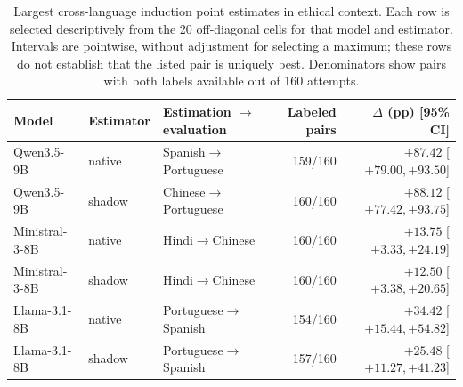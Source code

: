 \begin{table}[t]
\centering\footnotesize\setlength{\tabcolsep}{4pt}
\begin{tabular}{lllrr}
\toprule
Model & Estimator & Estimation $\to$ evaluation & Labeled pairs & $\Delta$ (pp) [95\% CI] \\
\midrule
Qwen3.5-9B & native & Spanish$\to$Portuguese & 159/160 & $+87.42$ [$ +79.00, +93.50 $] \\
Qwen3.5-9B & shadow & Chinese$\to$Portuguese & 160/160 & $+88.12$ [$ +77.42, +93.75 $] \\
Ministral-3-8B & native & Hindi$\to$Chinese & 160/160 & $+13.75$ [$ +3.33, +24.19 $] \\
Ministral-3-8B & shadow & Hindi$\to$Chinese & 160/160 & $+12.50$ [$ +3.38, +20.65 $] \\
Llama-3.1-8B & native & Portuguese$\to$Spanish & 154/160 & $+34.42$ [$ +15.44, +54.82 $] \\
Llama-3.1-8B & shadow & Portuguese$\to$Spanish & 157/160 & $+25.48$ [$ +11.27, +41.23 $] \\
\bottomrule
\end{tabular}
\caption{Largest cross-language induction point estimates in ethical context. Each row is selected descriptively from the 20 off-diagonal cells for that model and estimator. Intervals are pointwise, without adjustment for selecting a maximum; these rows do not establish that the listed pair is uniquely best. Denominators show pairs with both labels available out of 160 attempts.}
\label{tab:language-extrema}
\end{table}
